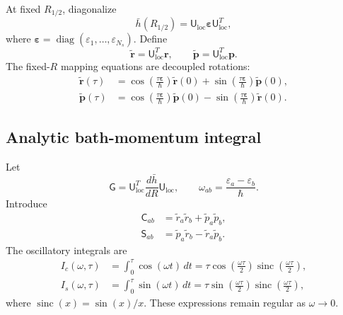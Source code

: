 \documentclass[
  11pt,
  letterpaper,
  onehalfspacing,
  normalmargins,
  equalmargins,
  oneside
]{ut-thesis}
\begin{document}
At fixed \(R_{1/2}\), diagonalize
\begin{equation}
\bar h(R_{1/2})
=
\mathsf U_{\mathrm{loc}}
\boldsymbol\varepsilon
\mathsf U_{\mathrm{loc}}^T,
\label{appeq:mint-local-diagonalization}
\end{equation}
where \(\boldsymbol\varepsilon=\operatorname{diag}
(\varepsilon_1,\ldots,\varepsilon_{N_s})\).  Define
\[
\widetilde{\mathbf r}
=
\mathsf U_{\mathrm{loc}}^T\mathbf r,
\qquad
\widetilde{\mathbf p}
=
\mathsf U_{\mathrm{loc}}^T\mathbf p.
\]
The fixed-\(R\) mapping equations are decoupled rotations:
\begin{align}
\widetilde{\mathbf r}(\tau)
&=
\cos\left(
\frac{\tau\boldsymbol\varepsilon}{\hbar}
\right)
\widetilde{\mathbf r}(0)
+
\sin\left(
\frac{\tau\boldsymbol\varepsilon}{\hbar}
\right)
\widetilde{\mathbf p}(0),
\\
\widetilde{\mathbf p}(\tau)
&=
\cos\left(
\frac{\tau\boldsymbol\varepsilon}{\hbar}
\right)
\widetilde{\mathbf p}(0)
-
\sin\left(
\frac{\tau\boldsymbol\varepsilon}{\hbar}
\right)
\widetilde{\mathbf r}(0).
\label{appeq:mint-mapping-rotation}
\end{align}

\subsection{Analytic bath-momentum integral}
\label{appsubsec:mint-momentum-integral}

Let
\begin{equation}
\mathsf G
=
\mathsf U_{\mathrm{loc}}^T
\frac{d\bar h}{dR}
\mathsf U_{\mathrm{loc}},
\qquad
\omega_{ab}
=
\frac{
\varepsilon_a-\varepsilon_b
}{
\hbar
}.
\label{appeq:mint-local-force-matrix}
\end{equation}
Introduce
\begin{align}
\mathsf C_{ab}
&=
\widetilde r_a\widetilde r_b
+
\widetilde p_a\widetilde p_b,
\\
\mathsf S_{ab}
&=
\widetilde p_a\widetilde r_b
-
\widetilde r_a\widetilde p_b.
\end{align}
The oscillatory integrals are
\begin{align}
I_c(\omega,\tau)
&=
\int_0^\tau
\cos(\omega t)\,dt
=
\tau
\cos\left(\frac{\omega\tau}{2}\right)
\operatorname{sinc}
\left(\frac{\omega\tau}{2}\right),
\\
I_s(\omega,\tau)
&=
\int_0^\tau
\sin(\omega t)\,dt
=
\tau
\sin\left(\frac{\omega\tau}{2}\right)
\operatorname{sinc}
\left(\frac{\omega\tau}{2}\right),
\label{appeq:mint-stable-integrals}
\end{align}
where \(\operatorname{sinc}(x)=\sin(x)/x\).  These expressions remain regular
as \(\omega\rightarrow0\).
\end{document}
